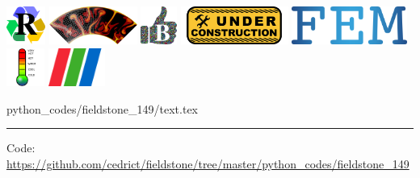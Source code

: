 \includegraphics[height=1.25cm]{images/pictograms/replication}
\includegraphics[height=1.25cm]{images/pictograms/aspect_logo}
\includegraphics[height=1.25cm]{images/pictograms/benchmark}
\includegraphics[height=1.25cm]{images/pictograms/under_construction}
\includegraphics[height=1.25cm]{images/pictograms/FEM}
\includegraphics[height=1.25cm]{images/pictograms/temperature}
\includegraphics[height=1.25cm]{images/pictograms/paraview}


\begin{flushright} {\tiny {\color{gray} python\_codes/fieldstone\_149/text.tex}} \end{flushright}



\par\noindent\rule{\textwidth}{0.4pt}

\begin{center}
\inpython
{\small Code: \url{https://github.com/cedrict/fieldstone/tree/master/python_codes/fieldstone_149}}
\end{center}

